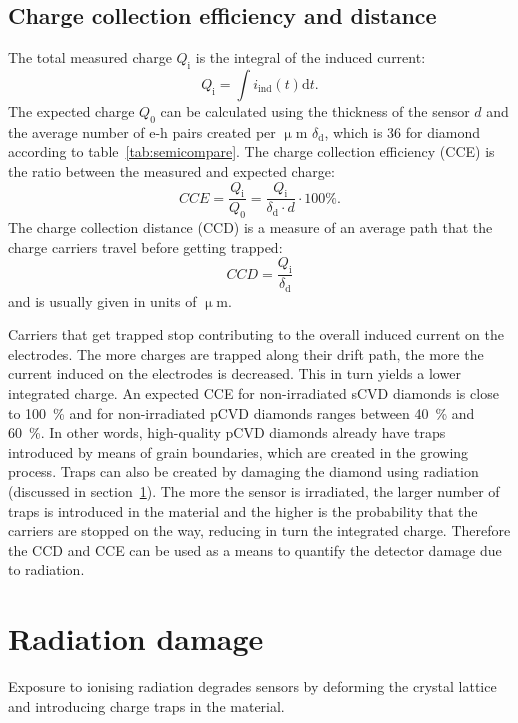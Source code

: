 \subsection{Charge collection efficiency and distance}
The total measured charge $Q_\mathrm{i}$ is the integral of the induced current:
\begin{equation}
Q_\mathrm{i}=\int i_\mathrm{ind}(t) \mathrm{d}t.
\end{equation}
The expected charge $Q_\mathrm{0}$ can be calculated using the thickness of the sensor $d$ and the average number of e-h pairs created per $\upmu$m $\delta_\mathrm{d}$, which is 36 for diamond according to table~\ref{tab:semicompare}. The charge collection efficiency (CCE) is the ratio between the measured and expected charge:
\begin{equation}
\label{eq:ccecalc1}
CCE = \frac{Q_\mathrm{i}}{Q_\mathrm{0}} = \frac{Q_\mathrm{i}}{\delta_\mathrm{d}\cdot d}\cdot100\%.
\end{equation}
The charge collection distance (CCD) is a measure of an average path that the charge carriers travel before getting trapped:
\begin{equation}
\label{eq:ccdcalc1}
CCD = \frac{Q_\mathrm{i}}{\delta_\mathrm{d}}
\end{equation}
and is usually given in units of $\upmu$m.

Carriers that get trapped stop contributing to the overall induced current on the electrodes. The more charges are trapped along their drift path, the more the current induced on the electrodes is decreased. This in turn yields a lower integrated charge. 
An expected CCE for non-irradiated sCVD diamonds is close to 100~\% and for non-irradiated pCVD diamonds ranges between 40~\% and 60~\%. In other words, high-quality pCVD diamonds already have traps introduced by means of grain boundaries, which are created in the growing process. Traps can also be created by damaging the diamond using radiation (discussed in section~\ref{sec:raddam}). The more the sensor is irradiated, the larger number of traps is introduced in the material and the higher is the probability that the carriers are stopped on the way, reducing in turn the integrated charge. Therefore the CCD and CCE can be used as a means to quantify the detector damage due to radiation.



\section{Radiation damage}
\label{sec:raddam}
Exposure to ionising radiation degrades sensors by deforming the crystal lattice and introducing charge traps in the material. 

